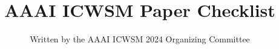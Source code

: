 \documentclass{article}
\begin{document}
\setcounter{secnumdepth}{0} %

%


\title{AAAI ICWSM Paper Checklist}
\author{
    Written by the AAAI ICWSM 2024 Organizing Committee}
\end{document}
